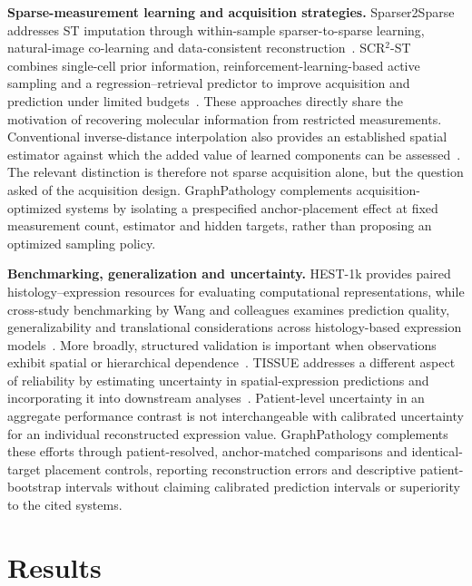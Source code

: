 \noindent\textbf{Sparse-measurement learning and acquisition strategies.}
Sparser2Sparse addresses ST imputation through within-sample sparser-to-sparse learning, natural-image co-learning and data-consistent reconstruction~\cite{sparser2026}. SCR$^2$-ST combines single-cell prior information, reinforcement-learning-based active sampling and a regression--retrieval predictor to improve acquisition and prediction under limited budgets~\cite{scr2st2026}. These approaches directly share the motivation of recovering molecular information from restricted measurements. Conventional inverse-distance interpolation also provides an established spatial estimator against which the added value of learned components can be assessed~\cite{shepard1968}. The relevant distinction is therefore not sparse acquisition alone, but the question asked of the acquisition design. GraphPathology complements acquisition-optimized systems by isolating a prespecified anchor-placement effect at fixed measurement count, estimator and hidden targets, rather than proposing an optimized sampling policy.

\noindent\textbf{Benchmarking, generalization and uncertainty.}
HEST-1k provides paired histology--expression resources for evaluating computational representations, while cross-study benchmarking by Wang and colleagues examines prediction quality, generalizability and translational considerations across histology-based expression models~\cite{jaume2024,wang2025}. More broadly, structured validation is important when observations exhibit spatial or hierarchical dependence~\cite{roberts2017}. TISSUE addresses a different aspect of reliability by estimating uncertainty in spatial-expression predictions and incorporating it into downstream analyses~\cite{sun2024}. Patient-level uncertainty in an aggregate performance contrast is not interchangeable with calibrated uncertainty for an individual reconstructed expression value. GraphPathology complements these efforts through patient-resolved, anchor-matched comparisons and identical-target placement controls, reporting reconstruction errors and descriptive patient-bootstrap intervals without claiming calibrated prediction intervals or superiority to the cited systems.

\section{Results}
